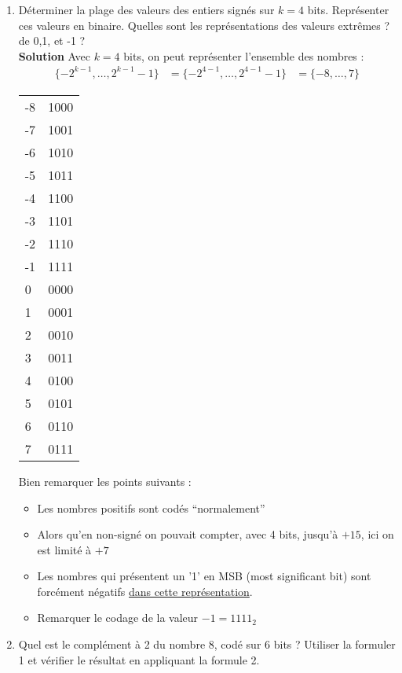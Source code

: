 \documentclass[a4paper,11pt]{article}
\begin{document}
\begin{enumerate}
\item Déterminer la plage des valeurs des entiers signés sur $k=4$ bits. Représenter ces valeurs en binaire. Quelles sont les représentations des valeurs extrêmes ? de 0,1, et -1 ?\\

{\bf Solution}
Avec $k=4$ bits, on peut représenter l'ensemble des nombres :
\begin{align}
\{-2^{k-1},\dots,2^{k-1}-1\} &= \{-2^{4-1},\dots,2^{4-1}-1\}
                          &= \{-8,\dots,7\}
\end{align}

\begin{center}
  \begin{tabular}{|l|l|}
    \hline
    -8 & 1000 \\
    -7 & 1001 \\
    -6 & 1010 \\
    -5 & 1011 \\
    -4 & 1100 \\
    -3 & 1101 \\
    -2 & 1110 \\
    -1 & 1111 \\
    0 & 0000 \\
    1 & 0001 \\
    2 & 0010\\
    3 & 0011\\
    4 & 0100\\
    5 & 0101\\
    6 & 0110\\
    7 & 0111\\
     \hline
  \end{tabular}
\end{center}
Bien remarquer les points suivants :
\begin{itemize}
\item Les nombres positifs sont codés ``normalement''
\item Alors qu'en non-signé on pouvait compter, avec 4 bits, jusqu'à $+15$, ici on est limité à $+7$
\item Les nombres qui présentent un '1' en MSB (most significant bit) sont forcément négatifs \underline{dans cette représentation}.
\item Remarquer le codage de la valeur $-1=1111_2$
\end{itemize}


\item Quel est le complément à 2 du nombre $8$, codé sur $6$ bits ? Utiliser la formuler 1 et vérifier le résultat en appliquant la formule 2.


\end{enumerate}
\end{document}
